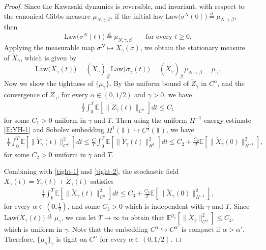 \documentclass{article}
\begin{document}
\begin{proof}
Since the Kawasaki dynamics is reversible, and invariant, with respect to the canonical Gibbs measure
\(\mu_{N,\gamma,\beta}\), if the initial law  \(\mathrm{Law}\bigl(\sigma^N(0)\bigr) \stackrel{\mathrm{d}}{=} \mu_{N,\gamma,\beta}\), then
\[
\mathrm{Law}\bigl(\sigma^N(t)\bigr) \stackrel{\mathrm{d}}{=} \mu_{N,\gamma,\beta}
\qquad\text{for every }t\ge0.
\]
Applying the measurable map \(\sigma^N\mapsto \widetilde X_\gamma(\sigma)\), we obtain the stationary measure of \(\widetilde X_\gamma\), which is given by
\[
\mathrm{Law}\bigl(\widetilde X_\gamma(t)\bigr)
=
(\widetilde X_\gamma)_\#\mathrm{Law}\bigl(\sigma_\gamma(t)\bigr)
=
(\widetilde X_\gamma)_\#\mu_{N,\gamma,\beta}
= \mu_\gamma.
\]
Now we show the tightness of \(\{\mu_\gamma\}\).
By the uniform bound of $\widetilde Z_\gamma$ in $C^\alpha$, and the convergence of $\widetilde Z_{\gamma}$, for every $\alpha \in (0,1/2)$ and $\gamma>0$, we have
\begin{align}\label{tight-1}
\frac1T \int_0^T \mathbb{E}[\|\widetilde Z_{\gamma}(t)\|_{C^{\alpha}}] dt
\le C_1
\end{align}
for some $C_1>0$ uniform in $\gamma$ and $T$. 
Then using the uniform $H^{-1}$-energy estimate \eqref{E:YH-1} and Sobolev embedding $H^{1}(\mathbb T) \hookrightarrow C^{\frac{1}{2}}(\mathbb T)$, we have 
\begin{align}\label{tight-2}
 \frac{1}{T}\int_{0}^{T} \mathbb{E}\left[ \|\widetilde Y_{\gamma}(t)\|_{C^{\frac12}}^2\right] dt\le \frac{C}{T} \int_{0}^{T} \mathbb{E}[\|\widetilde Y_{\gamma}(t)\|_{H^1}^2]dt
\le C_2 + \frac{C_2}{T} \mathbb{E}[\|\widetilde X_{\gamma}(0)\|_{H^{-1}}^{2}],
\end{align}
for some $C_2>0$ uniform in $\gamma$ and $T$. 

Combining with \eqref{tight-1} and \eqref{tight-2}, the stochastic field $\widetilde X_{\gamma}(t)=\widetilde Y_{\gamma}(t)+ \widetilde Z_{\gamma}(t)$ satisfies
\begin{align*}
\frac{1}{T} \int_{0}^{T} \mathbb{E}[\|\widetilde X_{\gamma}(t)\|_{C^{\alpha}}^2] dt
\le C_3 + \frac{C_3}{T} \mathbb{E}[\|\widetilde X_{\gamma}(0)\|_{H^{-1}}^2],
\end{align*}
for every $\alpha \in (0,\frac{1}{2})$, and some $C_3>0$ which is independent with $\gamma$ and $T$. 
Since $\mathrm{Law}\bigl(\widetilde X_\gamma(t)\bigr) \stackrel{\mathrm{d}}{=} \mu_{\gamma}$, we can let $T\to\infty$ to obtain that \( \mathbb{E}^{\mu_{\gamma}}[\| \widetilde X_{\gamma}\|_{C^{\alpha}}^2] \le C_4\),
which is uniform in $\gamma$.
Note that the embedding $C^{\alpha} \hookrightarrow C^{\alpha'}$
is compact if $\alpha > \alpha'$.
Therefore, $\{\mu_{\gamma}\}_\gamma$ is tight on $C^{\alpha}$
for every $\alpha \in (0,1/2)$.


\end{proof}
\end{document}
